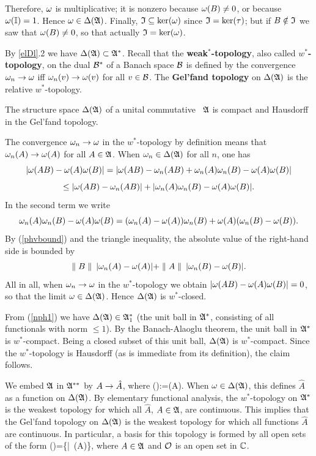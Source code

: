 Therefore, $\omega$ is multiplicative; it is nonzero because $\omega(B)\neq
0$, or because $\omega({\Bbb I})=1$.  Hence $\omega\in\Delta({\frak A})$. Finally,
${\frak I}\subseteq\ker(\omega)$ since ${\frak I}=\ker(\tau)$; but if $B\notin{\frak I}$ we
saw that $\omega(B)\neq 0$, so that actually ${\frak I}=\ker(\omega)$.\enp

By \ref{elDl}.2 we have $\Delta({\frak A})\subset{\frak A}^*$.  Recall that the {\bf
weak$\mbox{}^*$-topology}, also called {\bf $w^*$-topology}, on the
dual ${\cal B}^*$ of a Banach space ${\cal B}$ is defined by the convergence
$\omega_n\rightarrow\omega$ iff $\omega_n(v)\rightarrow\omega(v)$ for all $v\in{\cal B}$.  The {\bf
Gel'fand topology} on $\Delta({\frak A})$ is the relative $w^*$-topology.
\begin{Proposition}
The structure space $\Delta({\frak A})$ of a unital commutative \BA\ ${\frak A}$ is compact
and Hausdorff in the Gel'fand topology. \end{Proposition}
 

 The convergence $\omega_n\rightarrow\omega$ in the $w^*$-topology by definition
means that $\omega_n(A)\rightarrow\omega(A)$ for all $A\in{\frak A}$.  When $\omega_n\in\Delta({\frak A})$
for all $n$, one has
$$
|\omega(AB)-\omega(A)\omega(B)|=|\omega(AB)-\omega_n(AB)+\omega_n(A)\omega_n(B)-
\omega(A)\omega(B)|$$ $$ \leq |\omega(AB)-\omega_n(AB)|+|\omega_n(A)\omega_n(B)-
\omega(A)\omega(B)|.$$ In the second term we write
$$
\omega_n(A)\omega_n(B)- \omega(A)\omega(B)=(\omega_n(A)-\omega(A))\omega_n(B)+
\omega(A)(\omega_n(B)-\omega(B)).$$ By (\ref{phvbound}) and the triangle
inequality, the absolute value of the right-hand side is bounded by
$$
\parallel B\parallel\: |\omega_n(A)-\omega(A)|+\parallel A\parallel\: |\omega_n(B)-\omega(B)|.
$$
All in all, when $\omega_n\rightarrow\omega$ in the $w^*$-topology we obtain
 $|\omega(AB)-\omega(A)\omega(B)|=0$, so that the limit $\omega\in\Delta({\frak A})$.  Hence
 $\Delta({\frak A})$ is $w^*$-closed.

From (\ref{nph1}) we have $\Delta({\frak A})\in{\frak A}^*_1$ (the unit ball in ${\frak A}^*$,
consisting of all functionals with norm $\leq 1$). By the
Banach-Alaoglu theorem, the unit ball in ${\frak A}^*$ is
$w^*$-compact. Being a closed subset of this unit ball, $\Delta({\frak A})$ is
$w^*$-compact. Since the $w^*$-topology is Hausdorff (as is immediate
from its definition), the claim follows.\enp

We embed ${\frak A}$ in ${\frak A}^{**}$ by $A\rightarrow\hat{A}$, where \be
{}(\om):=\om(A).  \ee When $\omega\in\Delta({\frak A})$, this defines
$\hat{A}$ as a function on $\Delta({\frak A})$.  By elementary functional analysis,
the $w^*$-topology on ${\frak A}^*$ is the weakest topology for which all
$\hat{A}$, $A\in{\frak A}$, are continuous.  This implies that the Gel'fand
topology on $\Delta({\frak A})$ is the weakest topology for which all functions
$\hat{A}$ are continuous.  In particular, a basis for this topology is
formed by all open sets of the form \be
{}\inv(\CO)=\{\om\in\DA|\, \om(A)\in\CO\}, \ee where
$A\in{\frak A}$ and ${\cal O}$ is an open set in ${\Bbb C}$.

